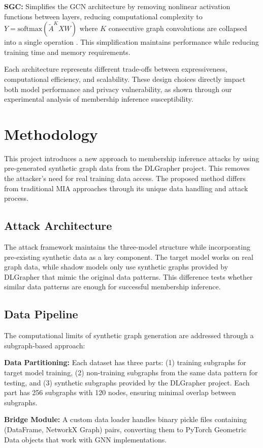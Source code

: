 \documentclass{article}
\begin{document}
\textbf{SGC:} Simplifies the GCN architecture by removing nonlinear activation functions between layers, reducing computational complexity to $Y = \text{softmax}(\tilde{A}^KXW)$ where $K$ consecutive graph convolutions are collapsed into a single operation \cite{wu2019simplifying}. This simplification maintains performance while reducing training time and memory requirements.

Each architecture represents different trade-offs between expressiveness, computational efficiency, and scalability. These design choices directly impact both model performance and privacy vulnerability, as shown through our experimental analysis of membership inference susceptibility.

\section{Methodology}
This project introduces a new approach to membership inference attacks by using pre-generated synthetic graph data from the DLGrapher project. This removes the attacker's need for real training data access. The proposed method differs from traditional MIA approaches through its unique data handling and attack process.

\subsection{Attack Architecture}
The attack framework maintains the three-model structure while incorporating pre-existing synthetic data as a key component. The target model works on real graph data, while shadow models only use synthetic graphs provided by DLGrapher that mimic the original data patterns. This difference tests whether similar data patterns are enough for successful membership inference.

\subsection{Data Pipeline}
The computational limits of synthetic graph generation are addressed through a subgraph-based approach:

\textbf{Data Partitioning:} Each dataset has three parts: (1) training subgraphs for target model training, (2) non-training subgraphs from the same data pattern for testing, and (3) synthetic subgraphs provided by the DLGrapher project. Each part has 256 subgraphs with 120 nodes, ensuring minimal overlap between subgraphs.

\textbf{Bridge Module:} A custom data loader handles binary pickle files containing (DataFrame, NetworkX Graph) pairs, converting them to PyTorch Geometric Data objects that work with GNN implementations.
\end{document}
